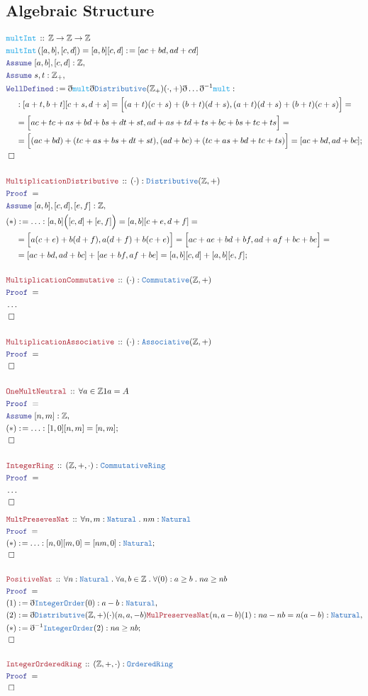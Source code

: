 \documentclass[12pt]{scrartcl}
\newcommand{\TYPE}[1]{\textcolor{NavyBlue}{\mathtt{#1}}}
\newcommand{\FUNC}[1]{\textcolor{Cerulean}{\mathtt{#1}}}
\newcommand{\LOGIC}[1]{\textcolor{Blue}{\mathtt{#1}}}
\newcommand{\THM}[1]{\textcolor{Maroon}{\mathtt{#1}}}
\renewcommand{\.}{\; . \;}
\newcommand{\de}{: \kern 0.1pc =}
\newcommand{\Act}[1]{\left( #1 \right)}
\newcommand{\Theorem}[2]{& \THM{#1} \, :: \, #2 \\ & \Proof = \\ }
\newcommand{\DeclareFunc}[2]{& \FUNC{#1} \, :: \, #2 \\}
\newcommand{\DefineNamedFunc}[4]{&  \FUNC{#1}\Act{#2} = #3 \de #4 \\}
\newcommand{\NewLine}{\\ & \kern 1pc}
\newcommand{\Page}[1]{ \begin{align*} #1 \end{align*}   }
\newcommand{ \bd }{ \ByDef }
\newcommand{\NoProof}{ & \ldots \\ \EndProof}
\newcommand{\Int}{\mathbb{Z} }
\newcommand{\Say}[3]{& #1 \de #2 : #3, \\}
\newcommand{\Conclude}[3]{& #1 \de #2 : #3; \\}
\newcommand{\Assume}[2]{& \LOGIC{Assume} \; #1 : #2, \\}
\newcommand{\QED}{\; \square}
\newcommand{\EndProof}{& \QED \\}
\newcommand{\ByDef}{\eth}
\newcommand{\Proof}{\LOGIC{Proof} \; }
\begin{document}
\subsection{Algebraic Structure}
\Page{
	\DeclareFunc{multInt}{ \Int \to \Int \to \Int}
	\DefineNamedFunc{multInt}{ [a,b],[c,d] }{[a,b][c,d]}{[ac + bd, ad + cd]}
	\Assume{[a,b],[c,d]}{\Int}
	\Assume{s,t}{\Int_+}
	\Conclude{\LOGIC{WellDefined}}{\bd \FUNC{mult}\bd \TYPE{Distributive}(\Int_+)(\cdot,+)\bd\ldots \bd^{-1}\FUNC{mult}}
	{
		\NewLine :
		[a + t,b + t][c + s,d + s] = 
		\Big[ (a + t)(c + s) + (b + t)(d + s) , (a + t)(d + s) + (b + t)(c + s)  \Big] = \NewLine =
		\Big[  ac + tc + as + bd + bs + dt + st, ad + as + td + ts + bc + bs + tc + ts \Big] = \NewLine =
		\Big[ (ac + bd)  + (tc + as + bs + dt + st), (ad + bc) + (tc + as + bd + tc + ts) \Big] = 
		[ac + bd, ad + bc] 
	}
	\EndProof
	\\
	\Theorem{MultiplicationDistributive}{(\cdot) : \TYPE{Distributive}(\Int,+)}
	\Assume{[a,b],[c,d],[e,f]}{ \Int  }
	\Conclude{(*)}{\ldots}
	{  
		[a,b]\Big( [c,d] + [e,f] \Big) =  
		[a,b][c + e, d + f] = \NewLine =
		\Big[ a(c + e) + b(d + f), a(d + f) + b(c + e) \Big] =  
		\Big[ ac + ae + bd + bf, ad + af + bc + be   \Big] =  \NewLine =
		 [ac + bd, ad + bc  ] + [ ae + bf, af + be    ] = 
		[a,b][c,d] + [a,b][e,f]
	}
	\\
	\Theorem{MultiplicationCommutative}{(\cdot) : \TYPE{Commutative}(\Int,+)}
	\NoProof
	\\
	\Theorem{MultiplicationAssociative}{(\cdot) : \TYPE{Associative}(\Int,+)}
	\EndProof
	\\
	\Theorem{OneMultNeutral}{ \forall a \in \Int 1a = A}
	\Assume{[n,m]}{\Int}
	\Conclude{(*)}{\ldots}{ [1,0][n,m] = [n,m] }
	\EndProof
	\\
	\Theorem{IntegerRing}{(\Int,+,\cdot) : \TYPE{CommutativeRing}}
	\NoProof
}\Page{
	\Theorem{MultPresevesNat}{\forall n,m : \TYPE{Natural} \. nm : \TYPE{Natural}}
	\Conclude{(*)}{\ldots}{[n,0][m,0] = [nm,0] : \TYPE{Natural}}
	\EndProof
	\\
	\Theorem{PositiveNat}{\forall n : \TYPE{Natural} \. \forall a,b \in \Int \. \forall (0) : a \ge b \. na \ge nb}
	\Say{(1)}{\bd \TYPE{IntegerOrder}(0)}{a - b : \TYPE{Natural} }
	\Say{(2)}{\bd \TYPE{Distributive}(\Int,+)(\cdot)(n,a,-b)\THM{MulPreservesNat}(n,a-b)(1)}
	{  na - nb = n(a - b) : \TYPE{Natural}  }
	\Conclude{(*)}{\bd^{-1} \TYPE{IntegerOrder}(2)}{na \ge nb}
	\EndProof
	\\
	\Theorem{IntegerOrderedRing}{(\Int,+,\cdot) : \TYPE{OrderedRing}}
	\EndProof
	\\
}
\end{document}
